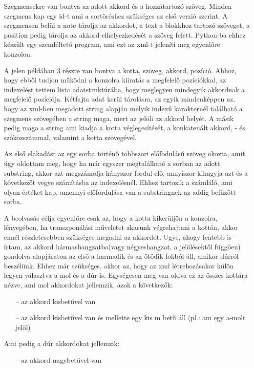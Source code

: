 Szegmensekre van bontva az adott akkord és a hozzátartozó szöveg. Minden szegmens kap egy id-t ami a sortöréshez szükséges az első verzió szerint. A szegmensen belül a note tárolja az akkordot, a text a blokkhoz tartozó szöveget, a position pedig tárolja az akkord elhelyezkedését a szöveg felett. Python-ba ehhez készült egy szemléltető program, ami ezt az xml-t jeleníti meg egyenlőre konzolon.

A jelen példában 3 részre van bontva a kotta, szöveg, akkord, pozíció. Ahhoz, hogy ebből tudjon  működni a konzolra kiiratás a megfelelő pozíciókkal, az indexelést tettem lista adatstruktúrába, hogy meglegyen mindegyik akkordnak a megfelelő pozíciója. Kétfajta adat kerül tárolásra, az egyik mindenképpen az, hogy az xml-ben megadott string alapján melyik indexű karakternél található a szegmens szövegében a string maga, mert az jelöli az akkord helyét. A másik pedig maga a string ami kiadja a kotta véglegesítését, a konkatenált akkord, - és szóközszámmal, valamint a kotta szövegével.

Az első elakadást az egy sorba történő többszöri előfodulású szöveg okozta, amit úgy oldottam meg, hogy ha már egyszer megtalálható a sorban az adott substring, akkor azt megszámolja hányszor fordul elő, annyiszor kihagyja azt és a következőt vegye számításba az indexelésnél. Ehhez tartozik a számláló, ami olyan értéket kap, amennyi előfordulása van a substringnek az addig befűzött sorba.

A beolvasás célja egyenlőre csak az, hogy a kotta kikerüljön a konzolra, lényegében, ha transzponálási műveletet akarunk végrehajtani a kottán, akkor ennél részletesebben szükséges megadni az akkordot. Ugye, ahogy fentebb is írtam, az akkord hármashangzatba(vagy négyeshangzat, a jelölésektől függően) gondolva alapjáraton az első a harmadik és az ötödik fokból áll, amikor dúrról beszélünk. Ehhez már szükséges, akkor az, hogy az xml létrehozásakor külön legyen választva a mol és a dúr is. Egységesen meg van oldva ez az összes kottára nézve, ami mol akkordokat jellemzik, azok a következők:
\begin{itemize}
	\item[--]az akkord kisbetűvel van
	\item[--]az akkord kisbetűvel van és mellette egy kis m betű áll (pl.: am egy a-molt jelöl)\linebreak
\end{itemize}
Ami pedig a dúr akkordokat jellemzik:
\begin{itemize}
	\item[--]az akkord nagybetűvel van
\end{itemize}

